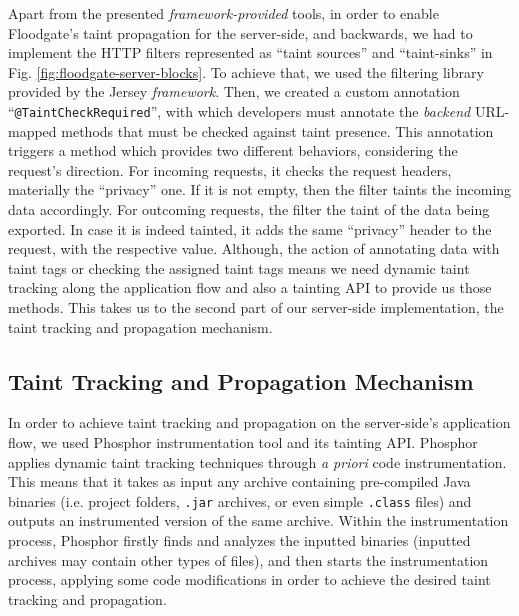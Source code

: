 Apart from the presented \textit{framework-provided} tools, in order to enable Floodgate's taint propagation for the server-side, and backwards, we had to implement the HTTP filters represented as ``taint sources'' and ``taint-sinks'' in Fig. \ref{fig:floodgate-server-blocks}. To achieve that, we used the filtering library provided by the Jersey \textit{framework}. Then, we created a custom annotation ``\texttt{@TaintCheckRequired}'', with which developers must annotate the \textit{backend} URL-mapped methods that must be checked against taint presence. This annotation triggers a method which provides two different behaviors, considering the request's direction. For incoming requests, it checks the request headers, materially the ``privacy'' one. If it is not empty, then the filter taints the incoming data accordingly. For outcoming requests, the filter the taint of the data being exported. In case it is indeed tainted, it adds the same ``privacy'' header to the request, with the respective value. Although, the action of annotating data with taint tags or checking the assigned taint tags means we need dynamic taint tracking along the application flow and also a tainting API to provide us those methods. This takes us to the second part of our server-side implementation, the taint tracking and propagation mechanism.

\subsection{Taint Tracking and Propagation Mechanism}

In order to achieve taint tracking and propagation on the server-side's application flow, we used Phosphor instrumentation tool and its tainting API. Phosphor applies dynamic taint tracking techniques through \textit{a priori} code instrumentation. This means that it takes as input any archive containing pre-compiled Java binaries (i.e. project folders, \texttt{.jar} archives, or even simple \texttt{.class} files) and outputs an instrumented version of the same archive. Within the instrumentation process, Phosphor firstly finds and analyzes the inputted binaries (inputted archives may contain other types of files), and then starts the instrumentation process, applying some code modifications in order to achieve the desired taint tracking and propagation.

